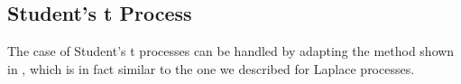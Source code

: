 \documentclass[journal]{IEEEtran}
\begin{document}
      




      



\subsection{Student's t Process}
The case of Student's t processes can be handled by adapting the method shown in \cite{fevotte2006bayesian}, which is in fact similar to the one we described for Laplace processes. 
\end{document}
